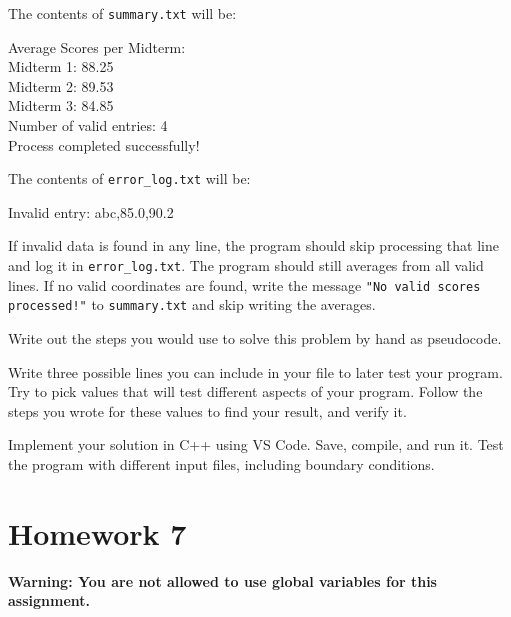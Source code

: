 The contents of \texttt{summary.txt} will be:

\begin{sample}
Average Scores per Midterm:\\
Midterm 1: 88.25\\
Midterm 2: 89.53\\
Midterm 3: 84.85\\

Number of valid entries: 4\\
Process completed successfully!
\end{sample}

The contents of \texttt{error_log.txt} will be:

\begin{sample}
Invalid entry: abc,85.0,90.2
\end{sample}

If invalid data is found in any line, the program should skip processing that line and log it in \texttt{error_log.txt}. The program should still averages from all valid lines. If no valid coordinates are found, write the message \texttt{"No valid scores processed!"} to \texttt{summary.txt} and skip writing the averages.

\begin{multipart}
    Write out the steps you would use to solve this problem by hand as pseudocode.
\end{multipart}

\vspace{8cm}

\begin{multipart}
    Write three possible lines you can include in your file to later test your program. Try to pick values that will test different aspects of your program. Follow the steps you wrote for these values to find your result, and verify it.
\end{multipart}

\vspace{5cm}

\begin{multipart}
    Implement your solution in C++ using VS Code. Save, compile, and run it. Test the program with different input files, including boundary conditions.
\end{multipart}

\newpage

\section{Homework 7}
\textbf{Warning: You are not allowed to use global variables for this assignment.}

